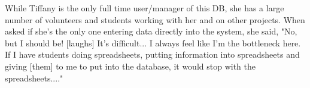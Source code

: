 While Tiffany is the only full time user/manager of this DB, she has a large number of volunteers and students working with her and on other projects.  When asked if she's the only one entering data directly into the system, she said, 
"No, but I should be!  [laughs]  It's difficult...  I always feel like I'm the bottleneck here.  If I have students doing spreadsheets, putting information into spreadsheets and giving [them] to me to put into the database, it would stop with the spreadsheets...."  

